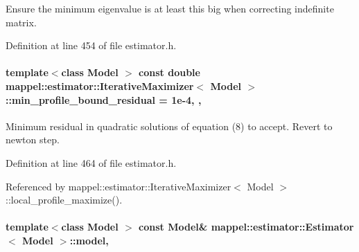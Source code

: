 Ensure the minimum eigenvalue is at least this big when correcting indefinite matrix. 



Definition at line 454 of file estimator.\+h.

\paragraph[{\texorpdfstring{min\+\_\+profile\+\_\+bound\+\_\+residual}{min_profile_bound_residual}}]{\setlength{\rightskip}{0pt plus 5cm}template$<$class Model $>$ const double {\bf mappel\+::estimator\+::\+Iterative\+Maximizer}$<$ Model $>$\+::min\+\_\+profile\+\_\+bound\+\_\+residual = 1e-\/4\hspace{0.3cm}{\ttfamily [static]}, {\ttfamily [protected]}, {\ttfamily [inherited]}}\hypertarget{classmappel_1_1estimator_1_1IterativeMaximizer_a04b56451448fa004f4ce3da97bfde9ec}{}\label{classmappel_1_1estimator_1_1IterativeMaximizer_a04b56451448fa004f4ce3da97bfde9ec}


Minimum residual in quadratic solutions of equation (8) to accept. Revert to newton step. 



Definition at line 464 of file estimator.\+h.



Referenced by mappel\+::estimator\+::\+Iterative\+Maximizer$<$ Model $>$\+::local\+\_\+profile\+\_\+maximize().

\paragraph[{\texorpdfstring{model}{model}}]{\setlength{\rightskip}{0pt plus 5cm}template$<$class Model $>$ const Model\& {\bf mappel\+::estimator\+::\+Estimator}$<$ Model $>$\+::model\hspace{0.3cm}{\ttfamily [protected]}, {\ttfamily [inherited]}}\hypertarget{classmappel_1_1estimator_1_1Estimator_a2f157410771fb79a20d4d54e505750d0}{}\label{classmappel_1_1estimator_1_1Estimator_a2f157410771fb79a20d4d54e505750d0}


